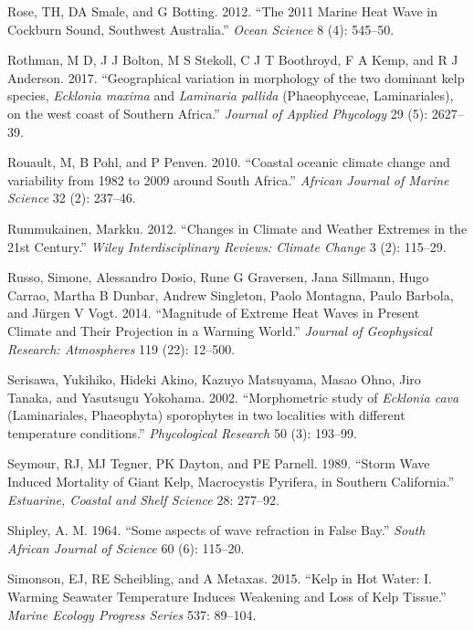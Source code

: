 \documentclass[
  a4paper,
]{article}
\begin{document}
\leavevmode\hypertarget{ref-Rose2012}{}%
Rose, TH, DA Smale, and G Botting. 2012. ``The 2011 Marine Heat Wave in
Cockburn Sound, Southwest Australia.'' \emph{Ocean Science} 8 (4):
545--50.

\leavevmode\hypertarget{ref-Rothman2017-pn}{}%
Rothman, M D, J J Bolton, M S Stekoll, C J T Boothroyd, F A Kemp, and R
J Anderson. 2017. ``Geographical variation in morphology of the two
dominant kelp species, \emph{Ecklonia maxima} and \emph{Laminaria
pallida} (Phaeophyceae, Laminariales), on the west coast of Southern
Africa.'' \emph{Journal of Applied Phycology} 29 (5): 2627--39.

\leavevmode\hypertarget{ref-Rouault2010-gi}{}%
Rouault, M, B Pohl, and P Penven. 2010. ``Coastal oceanic climate change
and variability from 1982 to 2009 around South Africa.'' \emph{African
Journal of Marine Science} 32 (2): 237--46.

\leavevmode\hypertarget{ref-Rummukainen2012}{}%
Rummukainen, Markku. 2012. ``Changes in Climate and Weather Extremes in
the 21st Century.'' \emph{Wiley Interdisciplinary Reviews: Climate
Change} 3 (2): 115--29.

\leavevmode\hypertarget{ref-Russo2014}{}%
Russo, Simone, Alessandro Dosio, Rune G Graversen, Jana Sillmann, Hugo
Carrao, Martha B Dunbar, Andrew Singleton, Paolo Montagna, Paulo
Barbola, and Jürgen V Vogt. 2014. ``Magnitude of Extreme Heat Waves in
Present Climate and Their Projection in a Warming World.'' \emph{Journal
of Geophysical Research: Atmospheres} 119 (22): 12--500.

\leavevmode\hypertarget{ref-Serisawa2002-dc}{}%
Serisawa, Yukihiko, Hideki Akino, Kazuyo Matsuyama, Masao Ohno, Jiro
Tanaka, and Yasutsugu Yokohama. 2002. ``Morphometric study of
\emph{Ecklonia cava} (Laminariales, Phaeophyta) sporophytes in two
localities with different temperature conditions.'' \emph{Phycological
Research} 50 (3): 193--99.

\leavevmode\hypertarget{ref-seymour1989}{}%
Seymour, RJ, MJ Tegner, PK Dayton, and PE Parnell. 1989. ``Storm Wave
Induced Mortality of Giant Kelp, Macrocystis Pyrifera, in Southern
California.'' \emph{Estuarine, Coastal and Shelf Science} 28: 277--92.

\leavevmode\hypertarget{ref-Shipley1964}{}%
Shipley, A. M. 1964. ``Some aspects of wave refraction in False Bay.''
\emph{South African Journal of Science} 60 (6): 115--20.

\leavevmode\hypertarget{ref-Simonson2015}{}%
Simonson, EJ, RE Scheibling, and A Metaxas. 2015. ``Kelp in Hot Water:
I. Warming Seawater Temperature Induces Weakening and Loss of Kelp
Tissue.'' \emph{Marine Ecology Progress Series} 537: 89--104.
\end{document}
